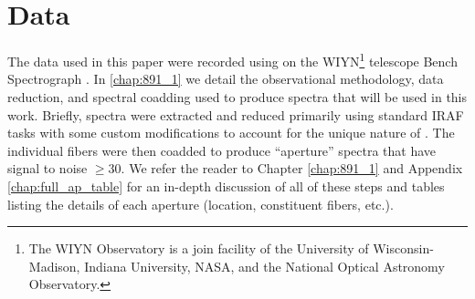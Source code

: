 \section{Data}
\label{891_2:sec:data}
The data used in this paper were recorded using \GP \citep{Wood12} on
the WIYN\footnote{The WIYN Observatory is a join facility of the
  University of Wisconsin-Madison, Indiana University, NASA, and the
  National Optical Astronomy Observatory.} telescope Bench
Spectrograph \citep{Barden94,Bershady08,Knezek10}. In \ref{chap:891_1}
we detail the observational methodology, data reduction, and spectral
coadding used to produce spectra that will be used in this
work. Briefly, spectra were extracted and reduced primarily using
standard IRAF tasks with some custom modifications to account for the
unique nature of \GP. The individual fibers were then coadded to
produce ``aperture'' spectra that have signal to noise $\geq 30$. We
refer the reader to Chapter \ref{chap:891_1} and Appendix
\ref{chap:full_ap_table} for an in-depth discussion of all of these
steps and tables listing the details of each aperture (location,
constituent fibers, etc.).

